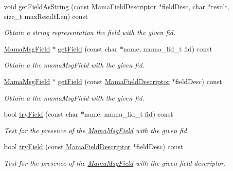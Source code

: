 \begin{DoxyCompactItemize}
void \hyperlink{classWombat_1_1MamaMsg_a05c09e3881c04eb299f6f1ea2c1c23e8}{getFieldAsString} (const \hyperlink{classWombat_1_1MamaFieldDescriptor}{MamaFieldDescriptor} $\ast$fieldDesc, char $\ast$result, size\_\-t maxResultLen) const 
\begin{DoxyCompactList}\small\item\em Obtain a string representation the field with the given fid. \item\end{DoxyCompactList}\item 
\hyperlink{classWombat_1_1MamaMsgField}{MamaMsgField} $\ast$ \hyperlink{classWombat_1_1MamaMsg_af28564db85ad4c1bd5fafffa0516891a}{getField} (const char $\ast$name, mama\_\-fid\_\-t fid) const 
\begin{DoxyCompactList}\small\item\em Obtain a the mamaMsgField with the given fid. \item\end{DoxyCompactList}\item 
\hyperlink{classWombat_1_1MamaMsgField}{MamaMsgField} $\ast$ \hyperlink{classWombat_1_1MamaMsg_a5b9641bc62c364a653d57e442198769e}{getField} (const \hyperlink{classWombat_1_1MamaFieldDescriptor}{MamaFieldDescriptor} $\ast$fieldDesc) const 
\begin{DoxyCompactList}\small\item\em Obtain a the mamaMsgField with the given fid. \item\end{DoxyCompactList}\item 
bool \hyperlink{classWombat_1_1MamaMsg_aecb00c865c2f849cec333916cdc66292}{tryField} (const char $\ast$name, mama\_\-fid\_\-t fid) const 
\begin{DoxyCompactList}\small\item\em Test for the presence of the \hyperlink{classWombat_1_1MamaMsgField}{MamaMsgField} with the given fid. \item\end{DoxyCompactList}\item 
bool \hyperlink{classWombat_1_1MamaMsg_abc084cb8d7ae285cf4a561fbe5041eac}{tryField} (const \hyperlink{classWombat_1_1MamaFieldDescriptor}{MamaFieldDescriptor} $\ast$fieldDesc) const 
\begin{DoxyCompactList}\small\item\em Test for the presence of the \hyperlink{classWombat_1_1MamaMsgField}{MamaMsgField} with the given field descriptor. \item\end{DoxyCompactList}\item 

\end{DoxyCompactItemize}

